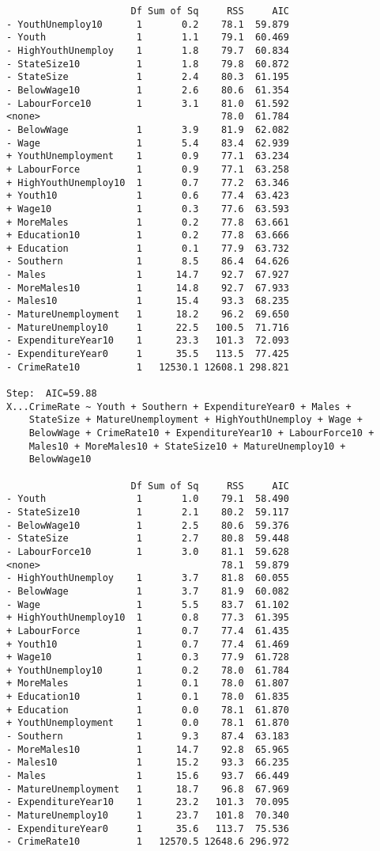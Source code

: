 \documentclass[11pt]{article}
\begin{document}
\begin{enumerate}
\begin{verbatim}
                      Df Sum of Sq     RSS     AIC
- YouthUnemploy10      1       0.2    78.1  59.879
- Youth                1       1.1    79.1  60.469
- HighYouthUnemploy    1       1.8    79.7  60.834
- StateSize10          1       1.8    79.8  60.872
- StateSize            1       2.4    80.3  61.195
- BelowWage10          1       2.6    80.6  61.354
- LabourForce10        1       3.1    81.0  61.592
<none>                                78.0  61.784
- BelowWage            1       3.9    81.9  62.082
- Wage                 1       5.4    83.4  62.939
+ YouthUnemployment    1       0.9    77.1  63.234
+ LabourForce          1       0.9    77.1  63.258
+ HighYouthUnemploy10  1       0.7    77.2  63.346
+ Youth10              1       0.6    77.4  63.423
+ Wage10               1       0.3    77.6  63.593
+ MoreMales            1       0.2    77.8  63.661
+ Education10          1       0.2    77.8  63.666
+ Education            1       0.1    77.9  63.732
- Southern             1       8.5    86.4  64.626
- Males                1      14.7    92.7  67.927
- MoreMales10          1      14.8    92.7  67.933
- Males10              1      15.4    93.3  68.235
- MatureUnemployment   1      18.2    96.2  69.650
- MatureUnemploy10     1      22.5   100.5  71.716
- ExpenditureYear10    1      23.3   101.3  72.093
- ExpenditureYear0     1      35.5   113.5  77.425
- CrimeRate10          1   12530.1 12608.1 298.821

Step:  AIC=59.88
X...CrimeRate ~ Youth + Southern + ExpenditureYear0 + Males + 
    StateSize + MatureUnemployment + HighYouthUnemploy + Wage + 
    BelowWage + CrimeRate10 + ExpenditureYear10 + LabourForce10 + 
    Males10 + MoreMales10 + StateSize10 + MatureUnemploy10 + 
    BelowWage10

                      Df Sum of Sq     RSS     AIC
- Youth                1       1.0    79.1  58.490
- StateSize10          1       2.1    80.2  59.117
- BelowWage10          1       2.5    80.6  59.376
- StateSize            1       2.7    80.8  59.448
- LabourForce10        1       3.0    81.1  59.628
<none>                                78.1  59.879
- HighYouthUnemploy    1       3.7    81.8  60.055
- BelowWage            1       3.7    81.9  60.082
- Wage                 1       5.5    83.7  61.102
+ HighYouthUnemploy10  1       0.8    77.3  61.395
+ LabourForce          1       0.7    77.4  61.435
+ Youth10              1       0.7    77.4  61.469
+ Wage10               1       0.3    77.9  61.728
+ YouthUnemploy10      1       0.2    78.0  61.784
+ MoreMales            1       0.1    78.0  61.807
+ Education10          1       0.1    78.0  61.835
+ Education            1       0.0    78.1  61.870
+ YouthUnemployment    1       0.0    78.1  61.870
- Southern             1       9.3    87.4  63.183
- MoreMales10          1      14.7    92.8  65.965
- Males10              1      15.2    93.3  66.235
- Males                1      15.6    93.7  66.449
- MatureUnemployment   1      18.7    96.8  67.969
- ExpenditureYear10    1      23.2   101.3  70.095
- MatureUnemploy10     1      23.7   101.8  70.340
- ExpenditureYear0     1      35.6   113.7  75.536
- CrimeRate10          1   12570.5 12648.6 296.972


\end{verbatim}
\end{enumerate}
\end{document}
